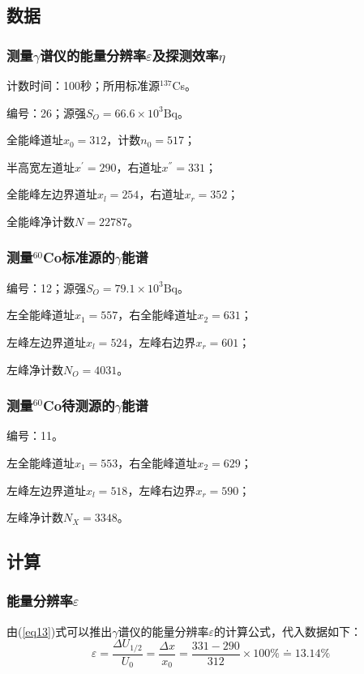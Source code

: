 \documentclass[a4paper]{article}
\begin{document}
\subsection{数据}
\subsubsection{测量$\gamma$谱仪的能量分辨率$\varepsilon$及探测效率$\eta$}
计数时间：100秒；所用标准源$^{137}$Cs。

编号：26；源强$S_O = 66.6\times 10^3\text{Bq}$。

全能峰道址$x_0 = 312$，计数$n_0 = 517$；

半高宽左道址$x^{'} = 290$，右道址$x^{''} = 331$；

全能峰左边界道址$x_l = 254$，右道址$x_r = 352$；

全能峰净计数$N = 22787$。%

\subsubsection{测量$^{60}$Co标准源的$\gamma$能谱}
编号：12；源强$S_O = 79.1\times 10^3\text{Bq}$。

左全能峰道址$x_1 = 557$，右全能峰道址$x_2 = 631$；

左峰左边界道址$x_l = 524$，左峰右边界$x_r = 601$；

左峰净计数$N_O = 4031$。%

\subsubsection{测量$^{60}$Co待测源的$\gamma$能谱}
编号：11。%

左全能峰道址$x_1 = 553$，右全能峰道址$x_2 = 629$；

左峰左边界道址$x_l = 518$，左峰右边界$x_r = 590$；

左峰净计数$N_X = 3348$。

\subsection{计算}
\subsubsection{能量分辨率$\varepsilon$}
由(\ref{eq13})式可以推出$\gamma$谱仪的能量分辨率$\varepsilon$的计算公式，代入数据如下：
\begin{equation}
\varepsilon = \frac{\Delta U_{1/2}}{U_0} = \frac{\Delta x}{x_0} = \frac{331 - 290}{312}\times 100\% \doteq 13.14\%\label{varepsilon}
\end{equation}
\end{document}
